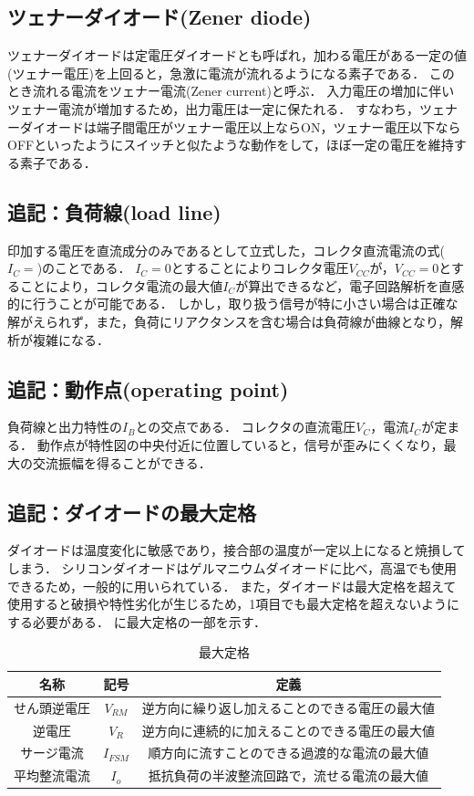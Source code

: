 \subsection{ツェナーダイオード(Zener diode)}
ツェナーダイオードは定電圧ダイオードとも呼ばれ，加わる電圧がある一定の値(ツェナー電圧)を上回ると，急激に電流が流れるようになる素子である．
このとき流れる電流をツェナー電流(Zener current)と呼ぶ．
入力電圧の増加に伴いツェナー電流が増加するため，出力電圧は一定に保たれる．
すなわち，ツェナーダイオードは端子間電圧がツェナー電圧以上ならON，ツェナー電圧以下ならOFFといったようにスイッチと似たような動作をして，ほぼ一定の電圧を維持する素子である．

\subsection{追記：負荷線(load line)\cite{1130282271098}\cite{1130000795906158592}}
印加する電圧を直流成分のみであるとして立式した，コレクタ直流電流の式($I_{C}=$)のことである．
$I_{C}=0$とすることによりコレクタ電圧$V_{CC}$が，$V_{CC}=0$とすることにより，コレクタ電流の最大値$I_{C}$が算出できるなど，電子回路解析を直感的に行うことが可能である．
しかし，取り扱う信号が特に小さい場合は正確な解がえられず，また，負荷にリアクタンスを含む場合は負荷線が曲線となり，解析が複雑になる．

\subsection{追記：動作点(operating point)\cite{1130282271098}\cite{1130000795906158592}}
負荷線と出力特性の$I_B$との交点である．
コレクタの直流電圧$V_C$，電流$I_C$が定まる．
動作点が特性図の中央付近に位置していると，信号が歪みにくくなり，最大の交流振幅を得ることができる．

\subsection{追記：ダイオードの最大定格\cite{113028227109820326432}}
ダイオードは温度変化に敏感であり，接合部の温度が一定以上になると焼損してしまう．
シリコンダイオードはゲルマニウムダイオードに比べ，高温でも使用できるため，一般的に用いられている．
また，ダイオードは最大定格を超えて使用すると破損や特性劣化が生じるため，1項目でも最大定格を超えないようにする必要がある．
に最大定格の一部を示す．

\begin{table}[h]
\centering
\caption{最大定格}
\label{tab:max}
\begin{tabular}{ccc}
\hline
名称     & 記号 & 定義     \\
\hline
せん頭逆電圧 &  $V_{RM}$  & 逆方向に繰り返し加えることのできる電圧の最大値 \\
逆電圧    &   $V_{R}$ & 逆方向に連続的に加えることのできる電圧の最大値 \\
サージ電流  & $I_{FSM}$   & 順方向に流すことのできる過渡的な電流の最大値  \\
平均整流電流 &  $I_{o}$  & 抵抗負荷の半波整流回路で，流せる電流の最大値 \\
\hline
\end{tabular}
\end{table}

